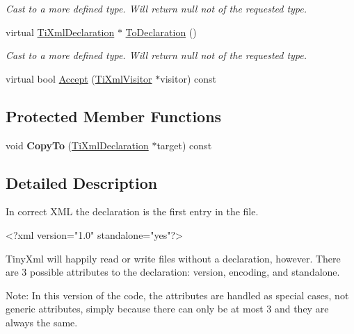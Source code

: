 \begin{DoxyCompactItemize}
\begin{DoxyCompactList}\small\item\em \-Cast to a more defined type. \-Will return null not of the requested type. \end{DoxyCompactList}\item 
\hypertarget{classTiXmlDeclaration_a6bd3d1daddcaeb9543c24bfd090969ce}{virtual \hyperlink{classTiXmlDeclaration}{\-Ti\-Xml\-Declaration} $\ast$ \hyperlink{classTiXmlDeclaration_a6bd3d1daddcaeb9543c24bfd090969ce}{\-To\-Declaration} ()}\label{classTiXmlDeclaration_a6bd3d1daddcaeb9543c24bfd090969ce}

\begin{DoxyCompactList}\small\item\em \-Cast to a more defined type. \-Will return null not of the requested type. \end{DoxyCompactList}\item 
virtual bool \hyperlink{classTiXmlDeclaration_ab6a6b178161ba9abc2c35058de689864}{\-Accept} (\hyperlink{classTiXmlVisitor}{\-Ti\-Xml\-Visitor} $\ast$visitor) const 
\end{DoxyCompactItemize}
\subsection*{\-Protected \-Member \-Functions}
\begin{DoxyCompactItemize}
\item 
\hypertarget{classTiXmlDeclaration_a9d08959f935421a593032bd3efb30c38}{void {\bfseries \-Copy\-To} (\hyperlink{classTiXmlDeclaration}{\-Ti\-Xml\-Declaration} $\ast$target) const }\label{classTiXmlDeclaration_a9d08959f935421a593032bd3efb30c38}

\end{DoxyCompactItemize}


\subsection{\-Detailed \-Description}
\-In correct \-X\-M\-L the declaration is the first entry in the file. \begin{DoxyVerb}
		<?xml version="1.0" standalone="yes"?>
	\end{DoxyVerb}


\-Tiny\-Xml will happily read or write files without a declaration, however. \-There are 3 possible attributes to the declaration\-: version, encoding, and standalone.

\-Note\-: \-In this version of the code, the attributes are handled as special cases, not generic attributes, simply because there can only be at most 3 and they are always the same. 

